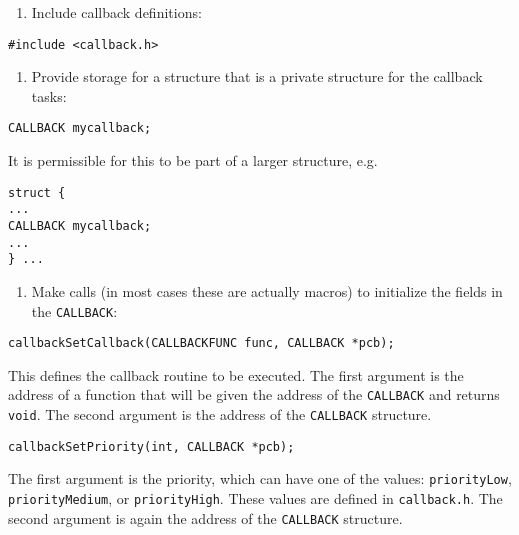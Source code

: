 \begin{enumerate}\item Include callback definitions:

\end{enumerate}\begin{verbatim}
#include <callback.h>

\end{verbatim}\begin{enumerate}\item Provide storage for a structure that is a private structure for the callback tasks:

\end{enumerate}\begin{verbatim}
CALLBACK mycallback;

\end{verbatim}\begin{description}\item It is permissible for this to be part of a larger structure, e.g.

\end{description}\begin{verbatim}
struct {
...
CALLBACK mycallback;
...
} ...

\end{verbatim}\begin{enumerate}\item Make calls (in most cases these are actually macros) to initialize the fields in the \verb|CALLBACK|:

\end{enumerate}\begin{verbatim}
callbackSetCallback(CALLBACKFUNC func, CALLBACK *pcb);

\end{verbatim}\begin{description}\item This defines the callback routine to be executed. The first argument is the address of a function that will be given 
the address of the \verb|CALLBACK| and returns \verb|void|. The second argument is the address of the \verb|CALLBACK| structure.

\end{description}\begin{verbatim}
callbackSetPriority(int, CALLBACK *pcb);

\end{verbatim}\begin{description}\item The first argument is the priority, which can have one of the values: \verb|priorityLow|, \verb|priorityMedium|, or 
\verb|priorityHigh|. These values are defined in \verb|callback.h|. The second argument is again the address of the 
\verb|CALLBACK| structure.


\end{description}
